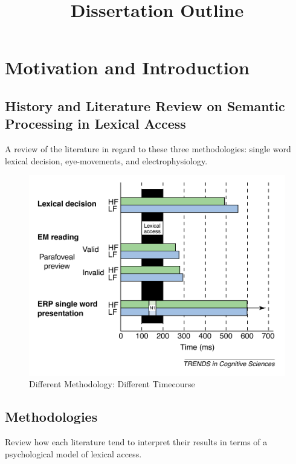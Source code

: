 \documentclass[english]{article}
\begin{document}
\title{Dissertation Outline}
\maketitle

\section{Motivation and Introduction}

\subsection{History and Literature Review on Semantic Processing in
            Lexical Access}
A review of the literature in regard to these three methodologies:
single word lexical decision, eye-movements, and electrophysiology.

\begin{figure}[H]
\begin{centering}
\includegraphics[scale=0.50]{review}
\par\end{centering}
\caption{\label{fig:review} Different Methodology: Different Timecourse}
\end{figure}

\subsection{Methodologies}
Review how each literature tend to interpret their results in terms of a
psychological model of lexical access.
\end{document}
